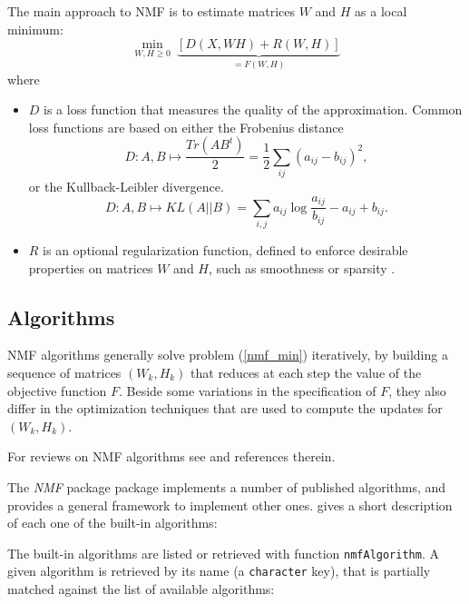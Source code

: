 \documentclass[a4paper]{article}\usepackage{graphicx, color}
\let\code=\texttt
\newcommand{\pkgname}[1]{\textit{#1}\xspace}
\newcommand{\Rpkg}[1]{\pkgname{#1} package\xspace}
\newcommand{\nmfpack}{\Rpkg{NMF}}
\newcommand{\refeqn}[1]{(\ref{#1})}
\renewcommand{\cite}[1]{\parencite{#1}}
\begin{document}
The main approach to NMF is to estimate matrices $W$ and $H$ as a local minimum:
\begin{equation}
\min_{W, H \geq 0}\ \underbrace{[D(X, WH) + R(W, H)]}_{=F(W,H)} \label{nmf_min}
\end{equation}
where 

\begin{itemize}
\item $D$ is a loss function that measures the quality of the approximation. 
Common loss functions are based on either the Frobenius distance 
$$D: A,B\mapsto \frac{Tr(AB^t)}{2} = \frac{1}{2} \sum_{ij} (a_{ij} - b_{ij})^2,$$
or the Kullback-Leibler divergence.
$$D: A,B\mapsto KL(A||B) = \sum_{i,j} a_{ij} \log \frac{a_{ij}}{b_{ij}} - a_{ij} + b_{ij}.$$
\item $R$ is an optional regularization function, defined to enforce desirable
properties on matrices $W$ and $H$, such as smoothness or sparsity
\cite{Cichocki2008}.
\end{itemize}

\subsection{Algorithms}
NMF algorithms generally solve problem \refeqn{nmf_min} iteratively, by building a sequence of matrices $(W_k,H_k)$ that reduces at each step the value of the objective function $F$.
Beside some variations in the specification of $F$, they also differ in the optimization techniques that are used to compute the updates for $(W_k,H_k)$.

For reviews on NMF algorithms see \cite{Berry2007, Chu2004} and references therein.

The \nmfpack package implements a number of published algorithms, and provides a general framework to implement other ones.
 gives a short description of each one of the built-in algorithms:

The built-in algorithms are listed or retrieved with function \code{nmfAlgorithm}. 
A given algorithm is retrieved by its name (a \code{character} key), that is partially matched against the list of available algorithms:
\end{document}
